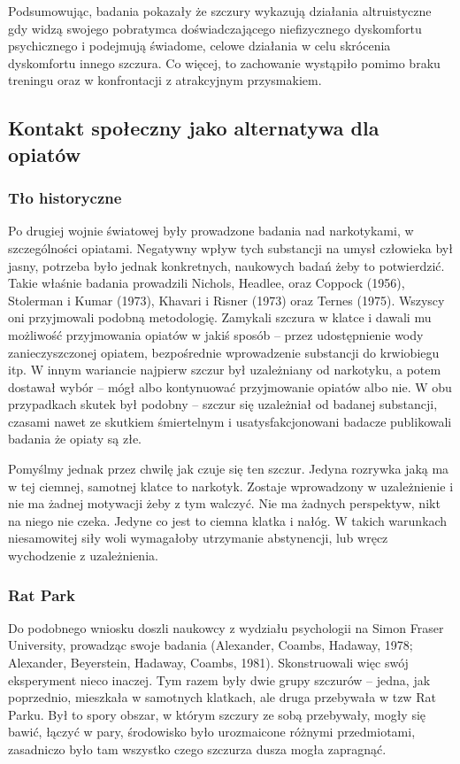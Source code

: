 \documentclass{psychol}
\begin{document}
Podsumowując, badania pokazały że szczury wykazują działania altruistyczne gdy widzą swojego pobratymca doświadczającego niefizycznego dyskomfortu psychicznego i podejmują świadome, celowe działania w celu skrócenia dyskomfortu innego szczura. Co więcej, to zachowanie wystąpiło pomimo braku treningu oraz w konfrontacji z atrakcyjnym przysmakiem.

\subsection{Kontakt społeczny jako alternatywa dla opiatów}

\subsubsection{Tło historyczne}

Po drugiej wojnie światowej były prowadzone badania nad narkotykami, w szczególności opiatami. Negatywny wpływ tych substancji na umysł człowieka był jasny, potrzeba było jednak konkretnych, naukowych badań żeby to potwierdzić. Takie właśnie badania prowadzili Nichols, Headlee, oraz Coppock (1956), Stolerman i Kumar (1973), Khavari i Risner (1973) oraz Ternes (1975). Wszyscy oni przyjmowali podobną metodologię. Zamykali szczura w klatce i dawali mu możliwość przyjmowania opiatów w jakiś sposób -- przez udostępnienie wody zanieczyszczonej opiatem, bezpośrednie wprowadzenie substancji do krwiobiegu itp. W innym wariancie najpierw szczur był uzależniany od narkotyku, a potem dostawał wybór -- mógł albo kontynuować przyjmowanie opiatów albo nie. W obu przypadkach skutek był podobny -- szczur się uzależniał od badanej substancji, czasami nawet ze skutkiem śmiertelnym i usatysfakcjonowani badacze publikowali badania że opiaty są złe.

Pomyślmy jednak przez chwilę jak czuje się ten szczur. Jedyna rozrywka jaką ma w tej ciemnej, samotnej klatce to narkotyk. Zostaje wprowadzony w uzależnienie i nie ma żadnej motywacji żeby z tym walczyć. Nie ma żadnych perspektyw, nikt na niego nie czeka. Jedyne co jest to ciemna klatka i nałóg. W takich warunkach niesamowitej siły woli wymagałoby utrzymanie abstynencji, lub wręcz wychodzenie z uzależnienia.

\subsubsection{Rat Park}

Do podobnego wniosku doszli naukowcy z wydziału psychologii na Simon Fraser University, prowadząc swoje badania (Alexander, Coambs, Hadaway, 1978; Alexander, Beyerstein, Hadaway, Coambs, 1981). Skonstruowali więc swój eksperyment nieco inaczej. Tym razem były dwie grupy szczurów -- jedna, jak poprzednio, mieszkała w samotnych klatkach, ale druga przebywała w tzw Rat Parku. Był to spory obszar, w którym szczury ze sobą przebywały, mogły się bawić, łączyć w pary, środowisko było urozmaicone różnymi przedmiotami, zasadniczo było tam wszystko czego szczurza dusza mogła zapragnąć.
\end{document}
